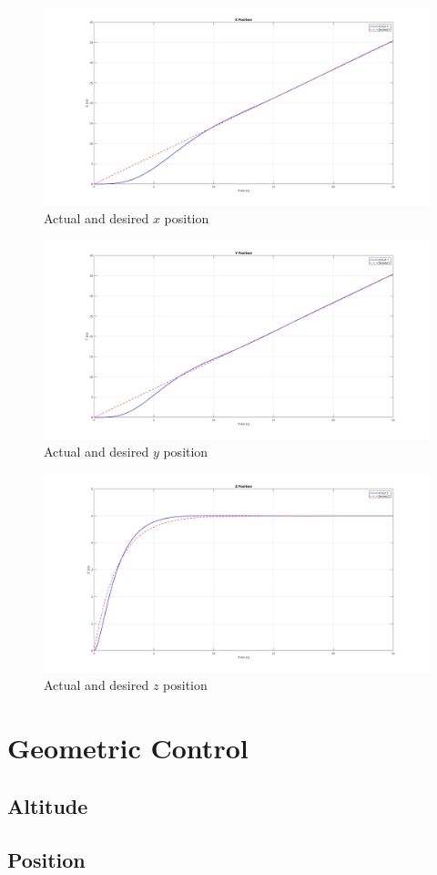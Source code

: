 \begin{figure}[h!]
    \centering
     \includegraphics[width=1\textwidth]{images/pd_x.jpg}
    \caption[Caption for Figure 3]{Actual and desired $x$ position}
    \label{fig:pid_x}
\end{figure}
\begin{figure}[h!]
    \centering
     \includegraphics[width=1\textwidth]{images/pd_y.jpg}
    \caption[Caption for Figure 4]{Actual and desired $y$ position}
    \label{fig:pid_y}
\end{figure}
\begin{figure}[h!]
    \centering
     \includegraphics[width=1\textwidth]{images/pd_z.jpg}
    \caption[Caption for Figure 5]{Actual and desired $z$ position}
    \label{fig:pid_z}
\end{figure}

\section{Geometric Control}
\subsection{Altitude}
\subsection{Position}
